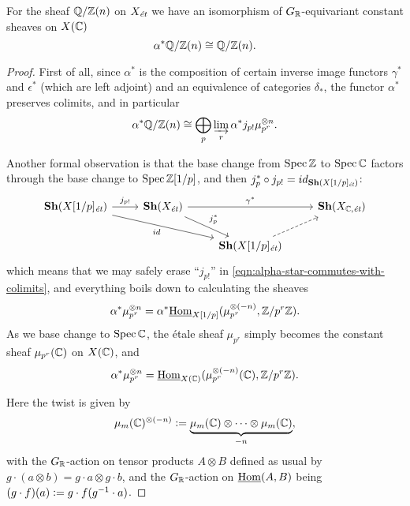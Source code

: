 \documentclass{article}
\numberwithin{equation}{section}
\begin{document}
\begin{proposition}
  \label{propn:image-of-Q/Zn-under-alpha}
  For the sheaf $\QQ/\ZZ (n)$ on $X_\et$ we have an isomorphism of
  $G_\RR$-equivariant constant sheaves on $X (\CC)$
  $$\alpha^* \QQ/\ZZ (n) \cong \QQ/\ZZ (n).$$

  \begin{proof}
    First of all, since $\alpha^*$ is the composition of certain inverse image
    functors $\gamma^*$ and $\epsilon^*$ (which are left adjoint) and an
    equivalence of categories $\delta_*$, the functor $\alpha^*$ preserves
    colimits, and in particular
    \begin{equation}
      \label{eqn:alpha-star-commutes-with-colimits}
      \alpha^* \QQ/\ZZ (n) \cong \bigoplus_p \varinjlim_r \alpha^* j_{p!} \mu_{p^r}^{\otimes n}.
    \end{equation}

    Another formal observation is that the base change from $\Spec \ZZ$ to
    $\Spec \CC$ factors through the base change to $\Spec \ZZ [1/p]$, and then
    $j_p^* \circ j_{p!} = id_{\mathbf{Sh} (X [1/p]_\et)}$:
    \[ \begin{tikzcd}
      \mathbf{Sh} (X [1/p]_\et) \ar{r}{j_{p!}}\ar{drr}[swap]{id} & \mathbf{Sh} (X_\et) \ar{rr}{\gamma^*}\ar{dr}{j_p^*} & & \mathbf{Sh} (X_{\CC,\text{\it ét}}) \\
      & & \mathbf{Sh} (X [1/p]_\et)\ar[dashed]{ur}
    \end{tikzcd} \]
    which means that we may safely erase ``$j_{p!}$'' in
    \eqref{eqn:alpha-star-commutes-with-colimits}, and everything boils down to
    calculating the sheaves
    $$\alpha^* \mu_{p^r}^{\otimes n} = \alpha^* \iHom_{X [1/p]} (\mu_{p^r}^{\otimes (-n)}, \ZZ/p^r \ZZ).$$
    As we base change to $\Spec \CC$, the étale sheaf $\mu_{p^r}$ simply becomes
    the constant sheaf $\mu_{p^r} (\CC)$ on $X (\CC)$, and
    $$\alpha^* \mu_{p^r}^{\otimes n} = \iHom_{X (\CC)} (\mu_{p^r}^{\otimes (-n)} (\CC), \ZZ/p^r \ZZ).$$

    Here the twist is given by
    $$\mu_m (\CC)^{\otimes (-n)} \dfn \underbrace{\mu_m (\CC)\otimes\cdots\otimes\mu_m (\CC)}_{-n},$$
    with the $G_\RR$-action on tensor products $A\otimes B$ defined as usual
    by $g\cdot (a\otimes b) = g\cdot a\otimes g\cdot b$, and the
    $G_\RR$-action on $\iHom (A,B)$ being
    $(g\cdot f) (a) \dfn g\cdot f (g^{-1}\cdot a)$.


\end{proof}
\end{proposition}
\end{document}
